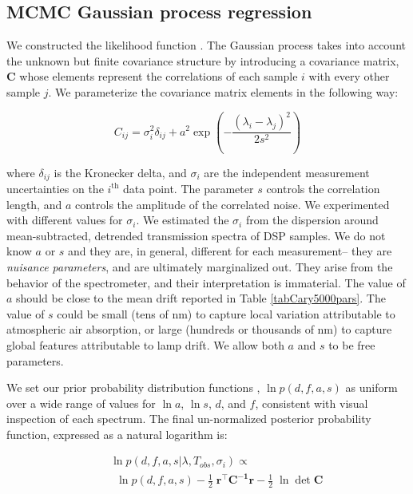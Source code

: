 \documentclass[osajnl,twocolumn,showpacs,superscriptaddress,11pt]{revtex4-1} %
\begin{document}
\subsection{MCMC Gaussian process regression}

We constructed the likelihood function \cite{2013sdmm.book.....I}.  The Gaussian process takes into account the unknown but finite covariance structure by introducing a covariance matrix, $\boldsymbol{C}$ whose elements represent the correlations of each sample $i$ with every other sample $j$.  We parameterize the covariance matrix elements in the following way:

\begin{equation}
	C_{ij} = \sigma^2_{i}\delta_{ij}+a^2\exp{(-\frac{(\lambda_i-\lambda_j)^2}{2s^2})} \label{eqnGPkernel}
\end{equation}

where $\delta_{ij}$ is the Kronecker delta, and $\sigma_i$ are the independent measurement uncertainties on the $i^{\mathrm{th}}$ data point. The parameter $s$ controls the correlation length, and $a$ controls the amplitude of the correlated noise.  We experimented with different values for $\sigma_i$.  We estimated the $\sigma_i$ from the dispersion around mean-subtracted, detrended transmission spectra of DSP samples.  We do not know $a$ or $s$ and they are, in general, different for each measurement-- they are \emph{nuisance parameters}, and are ultimately marginalized out.  They arise from the behavior of the spectrometer, and their interpretation is immaterial.  The value of $a$ should be close to the mean drift reported in Table \ref{tabCary5000pars}.  The value of $s$ could be small (tens of nm) to capture local variation attributable to atmospheric air absorption, or large (hundreds or thousands of nm) to capture global features attributable to lamp drift.  We allow both $a$ and $s$ to be free parameters.

We set our prior probability distribution functions \cite{2013sdmm.book.....I}, $\ln{p(d,f,a,s)}$ as uniform over a wide range of values for $\ln{a}$, $\ln{s}$, $d$, and $f$, consistent with visual inspection of each spectrum.  The final un-normalized posterior probability function, expressed as a natural logarithm is:

\begin{eqnarray}
	& &\ln{p(d,f,a,s|\lambda, T_{obs}, \sigma_i)} \propto  \nonumber\\
	& &\,\,\,\ln{p(d,f,a,s)} -\frac{1}{2}\;\boldsymbol{r^\intercal}\boldsymbol{C^{-1}}\boldsymbol{r} -\frac{1}{2}\;\ln{\det{\boldsymbol{C}}} \label{eqnPosterior}
\end{eqnarray}
\end{document}
